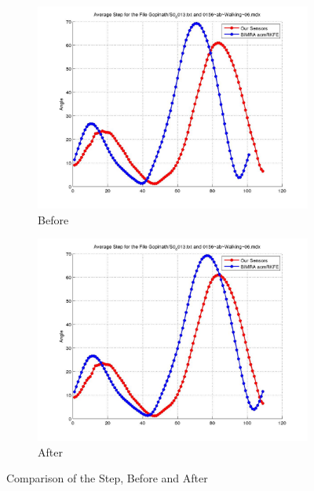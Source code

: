 \documentclass[12pt]{article}
\begin{document}
\begin{figure}[h]%

\begin{subfigure}[!htb]{2cm}
\hspace*{-2cm} \includegraphics[scale=.22]{S0_0013_before_acmrkfe.jpg}
\caption{Before}
\end{subfigure}
\hfill\hfill
\begin{subfigure}[h]{0.4\textwidth}
\hspace*{-2cm} \includegraphics[scale=.22]{S0_0013_after_acmrkfe.jpg}
\caption{After}
\end{subfigure}%

\caption[Hello]{Comparison of the Step, Before and After}
\end{figure}
\end{document}
